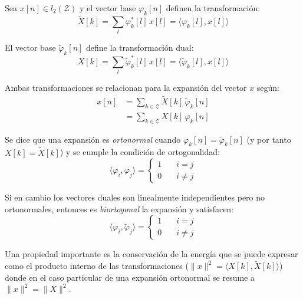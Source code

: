
	Sea $x[n] \in l_2(\mathcal{Z})$ y el vector base $\varphi_k[n]$ definen la transformación:
		\begin{equation*}
			\tilde{X}[k] = \sum_{l} \varphi^{*}_k [l] \, x[l] = \langle \varphi_k[l], x[l] \rangle
		\end{equation*}
	
	El vector base $\tilde{\varphi}_k[n]$ define la transformación dual:
		\begin{equation*}
			X[k] = \sum_{l} \tilde{\varphi}^{*}_k [l] \, x[l] = \langle \tilde{\varphi}_k[l], x[l] \rangle
		\end{equation*}

	Ambas transformaciones se relacionan para la expansión del vector $x$ según:
		\begin{align*}
			x[n]	&= \sum_{k\in\mathcal{Z}} \tilde{X}[k] \, \tilde{\varphi}_k[n]\\
				&= \sum_{k\in\mathcal{Z}} X[k] \, \varphi_k [n]
		\end{align*}
	
	Se dice que una expansión es \emph{ortonormal} cuando $\varphi_k[n] = \tilde{\varphi}_k[n]$ (y por tanto $X[k] = \tilde{X}[k]$) y se cumple la condición de ortogonalidad:
		\begin{equation*}
			\langle \varphi_i,\varphi_j \rangle = \begin{cases} 1 &\quad i=j \\ 0 &\quad i\neq j \end{cases}
		\end{equation*}

	Si en cambio los vectores duales son linealmente independientes pero no ortonormales, entonces es \emph{biortogonal} la expansión y satisfacen:
		\begin{equation*}
			\langle \varphi_i,\tilde{\varphi}_j \rangle = \begin{cases} 1 &\quad i=j \\ 0 &\quad i\neq j \end{cases}
		\end{equation*}

		Una propiedad importante es la conservación de la energía que se puede expresar como el producto interno de las transformaciones ($\| x\|^2 = \langle X[k],\tilde{X}[k] \rangle$) donde en el caso particular de una expansión ortonormal se resume a $\|x\|^2 = \|X\|^2$.
